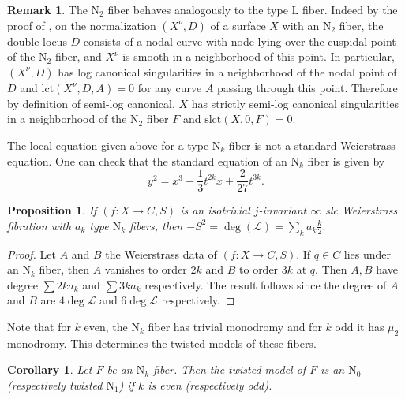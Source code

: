\documentclass[11pt]{amsart}
\newtheorem{prop}[theorem]{Proposition}
\newtheorem{cor}[theorem]{Corollary}
\theoremstyle{definition}
\newtheorem{remark}[theorem]{Remark}
\theoremstyle{remark}
\begin{document}
	\begin{remark}\label{rmk:n2} The $\mathrm{N}_2$ fiber behaves analogously to the type L fiber. Indeed by the proof of \cite[Lemma 5.1]{calculations}, on the normalization $(X^\nu, D)$ of a surface $X$ with an $\mathrm{N}_2$ fiber, the double locus $D$ consists of a nodal curve with node lying over the cuspidal point of the $\mathrm{N}_2$ fiber, and $X^\nu$ is smooth in a neighborhood of this point. In particular, $(X^\nu, D)$ has log canonical singularities in a neighborhood of the nodal point of $D$ and $\mathrm{lct}(X^\nu, D, A) = 0$ for any curve $A$ passing through this point. Therefore by definition of semi-log canonical, $X$ has strictly semi-log canonical singularities in a neighborhood of the $\mathrm{N}_2$ fiber $F$ and $\mathrm{slct}(X,0,F) = 0$. \end{remark}
	
	
	
	The local equation given above for a type $\mathrm{N}_k$ fiber is not a standard Weierstrass equation. One can check that the standard equation of an $\mathrm{N}_k$ fiber is given by
	\begin{equation}\label{eqn:Nk}
		y^2 = x^3 - \frac{1}{3}t^{2k}x + \frac{2}{27} t^{3k}. 
	\end{equation}
	
	
	\begin{prop}\label{prop:jinftyfibers} If $(f : X \to C, S)$ is an isotrivial $j$-invariant $\infty$ slc Weierstrass fibration with $a_k$ type $\mathrm{N}_k$ fibers, then 
		$
		-S^2 = \deg(\mathscr{L}) = \sum_k a_k \frac{k}{2}.$
	\end{prop} 
	
	\begin{proof} Let $A$ and $B$ the Weierstrass data of $(f : X \to C, S)$. If $q \in C$ lies under an $\mathrm{N}_k$ fiber, then $A$ vanishes to order $2k$ and $B$ to order $3k$ at $q$. Then $A,B$ have degree $\sum 2ka_k$ and $\sum 3ka_k$ respectively. The result follows since the degree of $A$ and $B$ are $4\deg \mathscr{L}$ and $6\deg \mathscr{L}$ respectively. \end{proof} 
	
	Note that for $k$ even, the $\mathrm{N}_k$ fiber has trivial monodromy and for $k$ odd it has $\mu_2$ monodromy. This determines the twisted models of these fibers. 
	
	\begin{cor}\label{cor:monodromyNk} Let $F$ be an $\mathrm{N}_k$ fiber. Then the twisted model of $F$ is an $\mathrm{N}_0$ (respectively twisted $\mathrm{N}_1$) if $k$ is even (respectively odd).\end{cor}
	
\end{document}
